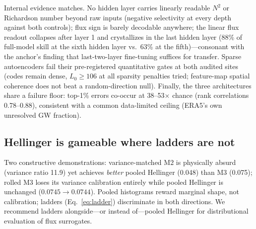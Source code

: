 \documentclass[10pt,twocolumn]{article}
\newcommand{\Mtwo}{\mathrm{M2}}
\newcommand{\Mthree}{\mathrm{M3}}
\begin{document}
Internal evidence matches. No hidden layer carries linearly readable $N^2$ or Richardson number beyond raw inputs (negative selectivity at every depth against both controls); flux sign is barely decodable anywhere; the linear flux readout collapses after layer 1 and crystallizes in the last hidden layer (88\% of full-model skill at the sixth hidden layer vs.\ 63\% at the fifth)---consonant with the anchor's finding that last-two-layer fine-tuning suffices for transfer. Sparse autoencoders fail their pre-registered quantitative gates at both audited sites (codes remain dense, $L_0\ge 106$ at all sparsity penalties tried; feature-map spatial coherence does not beat a random-direction null). Finally, the three architectures share a failure floor: top-1\% errors co-occur at 38--53$\times$ chance (rank correlations 0.78--0.88), consistent with a common data-limited ceiling (ERA5's own unresolved GW fraction).

\subsection{Hellinger is gameable where ladders are not}\label{sec:hellinger}
Two constructive demonstrations: variance-matched $\Mtwo$ is physically absurd (variance ratio 11.9) yet achieves \emph{better} pooled Hellinger (0.048) than $\Mthree$ (0.075); rolled $\Mthree$ loses its variance calibration entirely while pooled Hellinger is unchanged ($0.0745\!\to\!0.0744$). Pooled histograms reward marginal shape, not calibration; ladders (Eq.~\ref{eq:ladder}) discriminate in both directions. We recommend ladders alongside---or instead of---pooled Hellinger for distributional evaluation of flux surrogates.
\end{document}
